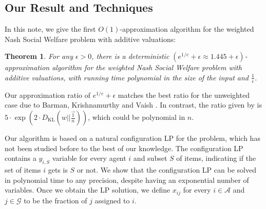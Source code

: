 \documentclass[10pt,a4paper]{article}
\newtheorem{theorem}{Theorem}[section]
\theoremstyle{definition}
\theoremstyle{plain}
\newcommand\calA{{\mathcal{A}}}
\newcommand\calG{{\mathcal{G}}}
\begin{document}
\subsection{Our Result and Techniques} 

In this note, we give the first $O(1)$-approximation algorithm for the weighted Nash Social Welfare problem with additive valuations:
\begin{theorem}
    \label{thm:main}
    For any $\epsilon > 0$, there is a deterministic $(e^{1/e} + \epsilon \approx 1.445 + \epsilon)$-approximation algorithm for the weighted Nash Social Welfare problem with additive valuations, with running time polynomial in the size of the input and $\frac1\epsilon$.
\end{theorem}

Our approximation ratio of $e^{1/e} + \epsilon$ matches the best ratio for the unweighted case due to Barman, Krishnamurthy and Vaish \cite{BKV18}.  In contrast, the ratio given by \cite{BLP24} is $5\cdot \exp(2 \cdot D_{\text{KL}}(w || \frac{\vec{1}}{n}))$, which could be polynomial in $n$. 
%

Our algorithm is based on a natural configuration LP for the problem, which has not been studied before to the best of our knowledge.  The configuration LP contains a $y_{i, S}$ variable for every agent $i$ and subset $S$ of items, indicating if the set of items $i$ gets is $S$ or not. We show that the configuration LP can be solved in polynomial time to any precision, despite having an exponential number of variables.  Once we obtain the LP solution, we define $x_{ij}$ for every $i \in \calA$ and $j \in \calG$ to be the fraction of $j$ assigned to $i$. 
\end{document}

